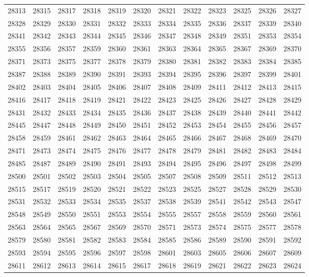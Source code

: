 \begin{center}
\begin{longtable}{llllllllllll}
28313 &28315 &28317 &28318 &28319 &28320 &28321 &28322 &28323 &28325 &28326 &28327 \\
28328 &28329 &28330 &28331 &28332 &28333 &28334 &28335 &28336 &28337 &28339 &28340 \\
28341 &28342 &28343 &28344 &28345 &28346 &28347 &28348 &28349 &28351 &28353 &28354 \\
28355 &28356 &28357 &28359 &28360 &28361 &28363 &28364 &28365 &28367 &28369 &28370 \\
28371 &28373 &28375 &28377 &28378 &28379 &28380 &28381 &28382 &28383 &28384 &28385 \\
28387 &28388 &28389 &28390 &28391 &28393 &28394 &28395 &28396 &28397 &28399 &28401 \\
28402 &28403 &28404 &28405 &28406 &28407 &28408 &28409 &28411 &28412 &28413 &28415 \\
28416 &28417 &28418 &28419 &28421 &28422 &28423 &28425 &28426 &28427 &28428 &28429 \\
28431 &28432 &28433 &28434 &28435 &28436 &28437 &28438 &28439 &28440 &28441 &28442 \\
28445 &28447 &28448 &28449 &28450 &28451 &28452 &28453 &28454 &28455 &28456 &28457 \\
28458 &28459 &28461 &28462 &28463 &28464 &28465 &28466 &28467 &28468 &28469 &28470 \\
28471 &28473 &28474 &28475 &28476 &28477 &28478 &28479 &28481 &28482 &28483 &28484 \\
28485 &28487 &28489 &28490 &28491 &28493 &28494 &28495 &28496 &28497 &28498 &28499 \\
28500 &28501 &28502 &28503 &28504 &28505 &28507 &28508 &28509 &28511 &28512 &28513 \\
28515 &28517 &28519 &28520 &28521 &28522 &28523 &28525 &28527 &28528 &28529 &28530 \\
28531 &28532 &28533 &28534 &28535 &28537 &28538 &28539 &28541 &28542 &28543 &28547 \\
28548 &28549 &28550 &28551 &28553 &28554 &28555 &28557 &28558 &28559 &28560 &28561 \\
28563 &28564 &28565 &28567 &28569 &28570 &28571 &28573 &28574 &28575 &28577 &28578 \\
28579 &28580 &28581 &28582 &28583 &28584 &28585 &28586 &28589 &28590 &28591 &28592 \\
28593 &28594 &28595 &28596 &28597 &28598 &28601 &28603 &28605 &28606 &28607 &28609 \\
28611 &28612 &28613 &28614 &28615 &28617 &28618 &28619 &28621 &28622 &28623 &28624 \\

\end{longtable}
\end{center}
